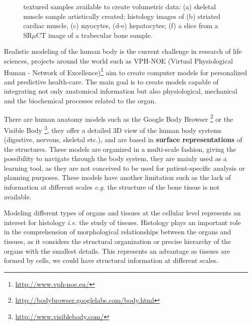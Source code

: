 

\begin{figure*}
 \centering 
 \caption{ textured samples available to create volumetric data: (a) skeletal muscle sample artistically created;
          histology images of (b) striated cardiac muscle, (c) myocytes, 
	  (d-e) hepatocytes; (f) a slice from a SR$\mu$CT image of a trabecular bone sample.
          }
 \label{fig:sampleimages}
\end{figure*}



Realistic modeling of the human body is the current challenge in research of life sciences, projects around the world 
such as VPH-NOE (Virtual Physiological Human - Network of Excellence)\footnote{\url{http://www.vph-noe.eu/}} 
aim to create computer models for personalized and predictive health-care. 
The main goal is to create models capable of integrating
not only anatomical information but also physiological, mechanical and the biochemical processes related to the organ.

There are human anatomy models such as the Google Body Browser \footnote{\url{http://bodybrowser.googlelabs.com/body.html}}
or the Visible Body \footnote{\url{http://www.visiblebody.com/}},
they offer a detailed 3D view of the human body systems (digestive, nervous, skeletal etc.), and are based in {\bf surface representations}
of the structures. These models are organized in a multi-scale fashion, giving the possibility to navigate through 
the body system, they are mainly used as a learning tool, as they are not conceived to be used for 
patient-specific analysis or planning purposes.
These models have another limitation such as the lack of information at different scales \emph{e.g.} the structure of the bone tissue is not available.

Modeling different types of organs and tissues at the cellular level represents an interest for histology 
\emph{i.e.} the study of tissues. Histology plays an important role in the comprehension of 
morphological relationships between the organs and tissues, as it considers the structural organization 
or precise hierarchy of the organs with the smallest details. 
This represents an advantage as tissues are formed by cells, we could have structural information at different scales.

